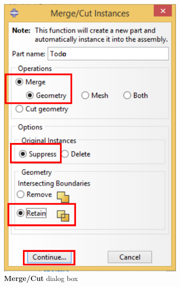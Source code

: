 \begin{itemize}
\begin{figure}[!h]
\begin{subfigure}[!h]{0.15\textwidth}
    \end{subfigure}%
    \begin{subfigure}[!h]{0.45\textwidth}
      \includegraphics[width=\textwidth]{./body/images/ayu04.pdf}
      \caption{\textbf{Merge/Cut} dialog box}
      \label{ayu04}
    \end{subfigure}%
    \begin{subfigure}[!h]{0.20\textwidth}

\end{subfigure}
\end{figure}
\end{itemize}

